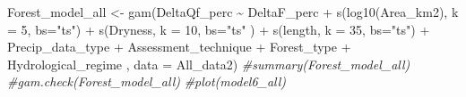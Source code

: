 \documentclass[]{elsarticle} %
\newenvironment{Shaded}{\begin{snugshade}}{\end{snugshade}}
\newcommand{\AttributeTok}[1]{\textcolor[rgb]{0.77,0.63,0.00}{#1}}
\newcommand{\CommentTok}[1]{\textcolor[rgb]{0.56,0.35,0.01}{\textit{#1}}}
\newcommand{\DecValTok}[1]{\textcolor[rgb]{0.00,0.00,0.81}{#1}}
\newcommand{\FunctionTok}[1]{\textcolor[rgb]{0.00,0.00,0.00}{#1}}
\newcommand{\NormalTok}[1]{#1}
\newcommand{\OtherTok}[1]{\textcolor[rgb]{0.56,0.35,0.01}{#1}}
\newcommand{\SpecialCharTok}[1]{\textcolor[rgb]{0.00,0.00,0.00}{#1}}
\newcommand{\StringTok}[1]{\textcolor[rgb]{0.31,0.60,0.02}{#1}}
\begin{document}
\begin{Shaded}
\begin{Highlighting}[]
\NormalTok{Forest\_model\_all }\OtherTok{\textless{}{-}} \FunctionTok{gam}\NormalTok{(DeltaQf\_perc }\SpecialCharTok{\textasciitilde{}}\NormalTok{ DeltaF\_perc }\SpecialCharTok{+} 
                    \FunctionTok{s}\NormalTok{(}\FunctionTok{log10}\NormalTok{(Area\_km2), }\AttributeTok{k =} \DecValTok{5}\NormalTok{, }\AttributeTok{bs=}\StringTok{"ts"}\NormalTok{) }\SpecialCharTok{+} 
                    \FunctionTok{s}\NormalTok{(Dryness, }\AttributeTok{k =} \DecValTok{10}\NormalTok{, }\AttributeTok{bs=}\StringTok{"ts"}\NormalTok{ ) }\SpecialCharTok{+} 
                     \FunctionTok{s}\NormalTok{(length, }\AttributeTok{k =} \DecValTok{35}\NormalTok{, }\AttributeTok{bs=}\StringTok{"ts"}\NormalTok{) }\SpecialCharTok{+}
\NormalTok{                    Precip\_data\_type }\SpecialCharTok{+}\NormalTok{  Assessment\_technique }\SpecialCharTok{+}
\NormalTok{                    Forest\_type }\SpecialCharTok{+}
\NormalTok{                    Hydrological\_regime}
\NormalTok{                    , }\AttributeTok{data =}\NormalTok{ All\_data2)}
\CommentTok{\#summary(Forest\_model\_all)}
\CommentTok{\#gam.check(Forest\_model\_all)}
\CommentTok{\#plot(model6\_all)}
\end{Highlighting}
\end{Shaded}
\end{document}
